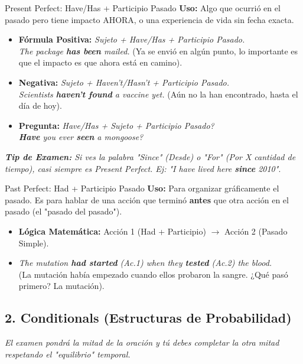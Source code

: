 \documentclass[11pt,a4paper]{article}
\begin{document}
\begin{hackbox}{Present Perfect: Have/Has + Participio Pasado}
    \textbf{Uso:} Algo que ocurrió en el pasado pero tiene impacto AHORA, o una experiencia de vida sin fecha exacta.
    \begin{itemize}[noitemsep]
        \item \textbf{Fórmula Positiva:} \textit{Sujeto + Have/Has + Participio Pasado.} \\
        \textit{The package \textbf{has been} mailed.} (Ya se envió en algún punto, lo importante es que el impacto es que ahora está en camino).
        \item \textbf{Negativa:} \textit{Sujeto + Haven't/Hasn't + Participio Pasado.} \\
        \textit{Scientists \textbf{haven't found} a vaccine yet.} (Aún no la han encontrado, hasta el día de hoy).
        \item \textbf{Pregunta:} \textit{Have/Has + Sujeto + Participio Pasado?} \\
        \textit{\textbf{Have} you ever \textbf{seen} a mongoose?}
    \end{itemize}
    \textit{\textbf{Tip de Examen:} Si ves la palabra "Since" (Desde) o "For" (Por X cantidad de tiempo), casi siempre es Present Perfect. Ej: "I have lived here \textbf{since} 2010"}.
\end{hackbox}

\begin{hackbox}{Past Perfect: Had + Participio Pasado}
    \textbf{Uso:} Para organizar gráficamente el pasado. Es para hablar de una acción que terminó \textbf{antes} que otra acción en el pasado (el "pasado del pasado").
    \begin{itemize}[noitemsep]
        \item \textbf{Lógica Matemática:} Acción 1 (Had + Participio) $\to$ Acción 2 (Pasado Simple).
        \item \textit{The mutation \textbf{had started} (Ac.1) when they \textbf{tested} (Ac.2) the blood.} \\
          (La mutación había empezado cuando ellos probaron la sangre. ¿Qué pasó primero? La mutación).
    \end{itemize}
\end{hackbox}

\subsection{2. Conditionals (Estructuras de Probabilidad)}
\textit{El examen pondrá la mitad de la oración y tú debes completar la otra mitad respetando el "equilibrio" temporal.}
\end{document}
